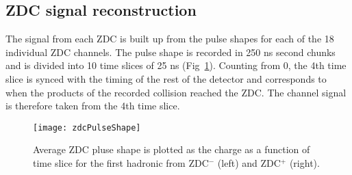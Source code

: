     \subsection{ZDC signal reconstruction}
      The signal from each ZDC is built up from the pulse shapes for each of 
        the 18 individual ZDC channels. 
      The pulse shape is recorded in 250 ns second chunks and is divided into
        10 time slices of 25 ns (\DIFdelbegin {}\DIFdelend \DIFaddbegin {}\DIFaddend Fig~\ref{fig:zdcPulseShape}).
      Counting from 0, the 4th time slice is synced with the timing of the rest
        of the detector and corresponds to when the products of the recorded 
        collision reached the ZDC.
      The channel signal is therefore taken from the 4th time slice.
      \begin{figure}[h]
        \centering
        \texttt{[image: zdcPulseShape]}
        \caption{Average ZDC pluse shape is plotted as the charge as a function
          of time slice for the first hadronic from ZDC$^{-}$ (left) and 
          ZDC$^{+}$ (right).}
        \label{fig:zdcPulseShape}
      \end{figure}

